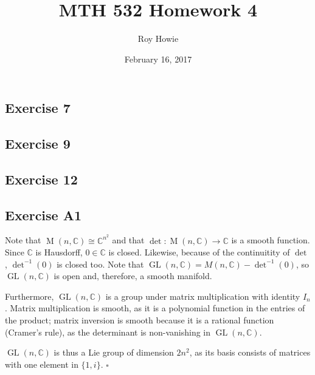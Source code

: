 \documentclass{article}
\newcommand{\C}{\mathbb{C}}
\DeclareMathOperator{\M}{M}
\DeclareMathOperator{\GL}{GL}
\begin{document}
\title{MTH 532 Homework 4}
\author{Roy Howie}
\date{February 16, 2017}
\maketitle

\subsection*{Exercise 7}
\subsection*{Exercise 9}
\subsection*{Exercise 12}

\subsection*{Exercise A1}
  Note that $\M(n,\C)\cong\C^{n^2}$ and that $\det\colon\M(n,\C)\to\C$ is a smooth
  function. Since $\C$ is Hausdorff, $0\in\C$ is closed. Likewise, because of
  the continuitity of $\det$, $\det^{-1}(0)$ is closed too. Note that $\GL(n,\C)
  =M(n,\C)-\det^{-1}(0)$, so $\GL(n,\C)$ is open and, therefore, a smooth manifold.

  Furthermore, $\GL(n,\C)$ is a group under matrix multiplication with identity
  $I_n$. Matrix multiplication is smooth, as it is a polynomial function in the
  entries of the product; matrix inversion is smooth because it is a rational
  function (Cramer's rule), as the determinant is non-vanishing in $\GL(n,\C)$.

  $\GL(n,\C)$ is thus a Lie group of dimension $2n^2$, as its basis consists of
  matrices with one element in $\{1,i\}$.
  \hfill $\square$
\end{document}
